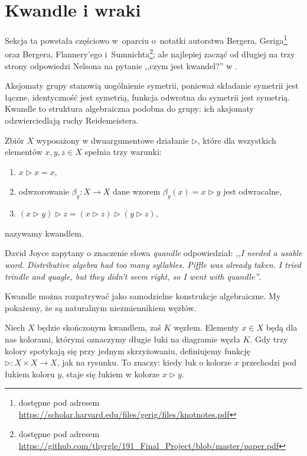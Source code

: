 
\section{Kwandle i wraki}
%

Sekcja ta powstała częściowo w~oparciu o~notatki autorstwa Bergera, Geriga\footnote{dostępne pod adresem \url{https://scholar.harvard.edu/files/gerig/files/knotnotes.pdf}} oraz Bergera, Flannery'ego i~Sumnichta\footnote{dostępne pod adresem \url{https://github.com/thyrgle/191_Final_Project/blob/master/paper.pdf}}; ale najlepiej zacząć od długiej na trzy strony odpowiedzi Nelsona na pytanie ,,czym jest kwandel?'' w \cite{nelson16}.
%
%
%
%


Aksjomaty grupy stanowią uogólnienie symetrii, ponieważ składanie symetrii jest łączne, identyczność jest symetrią, funkcja odwrotna do symetrii jest symetrią.
Kwandle to struktura algebraiczna podobna do grupy: ich aksjomaty odzwierciedlają ruchy Reidemeistera.
%

\begin{definition}[kwandel]
%
    Zbiór $X$ wyposażony w dwuargumentowe działanie $\triangleright$, które dla wszystkich elementów $x, y, z \in X$ spełnia trzy warunki:
    \begin{enumerate}
        \item $x \triangleright x = x$,
        \item odwzorowanie $\beta_y \colon X \to X$ dane wzorem $\beta_y(x) = x \triangleright y$ jest odwracalne,
        \item $(x \triangleright y) \triangleright z = (x \triangleright z) \triangleright (y \triangleright z)$,
    \end{enumerate}
    nazywamy kwandlem.
\end{definition}

David Joyce zapytany o znaczenie słowa \emph{quandle} odpowiedział: \emph{,,I needed a usable word. Distributive algebra had too many syllables. Piffle was already taken. I tried trindle and quagle, but they didn’t seem right, so I went with quandle''}.
%

Kwandle można rozpatrywać jako samodzielne konstrukcje algebraiczne.
My pokażemy, że są naturalnym niezmiennikiem węzłów.

Niech $X$ będzie skończonym kwandlem, zaś $K$ węzłem.
Elementy $x \in X$ będą dla nas kolorami, którymi oznaczymy długie łuki na diagramie węzła $K$.
Gdy trzy kolory spotykają się przy jednym skrzyżowaniu, definiujemy funkcję $\triangleright \colon X \times X \to X$, jak na rysunku.
To znaczy: kiedy łuk o kolorze $x$ przechodzi pod łukiem koloru $y$, staje się łukiem w kolorze $x \triangleright y$.
\begin{comment}
\[
    \LargeMinusCrossingQuandle
\]
\end{comment}


